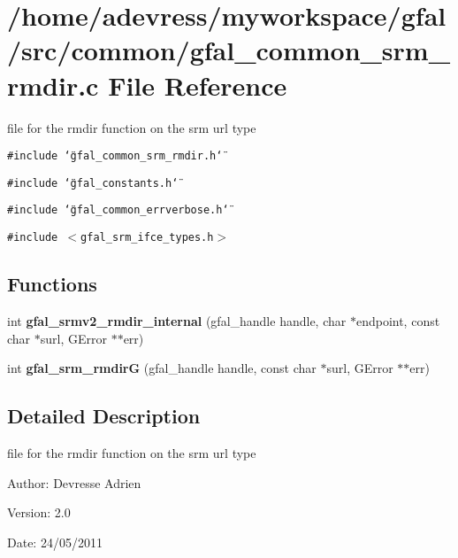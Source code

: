 \section{/home/adevress/myworkspace/gfal/src/common/gfal\_\-common\_\-srm\_\-rmdir.c File Reference}
\label{gfal__common__srm__rmdir_8c}
file for the rmdir function on the srm url type 

{\tt \#include \char`\"{}gfal\_\-common\_\-srm\_\-rmdir.h\char`\"{}}\par
{\tt \#include \char`\"{}gfal\_\-constants.h\char`\"{}}\par
{\tt \#include \char`\"{}gfal\_\-common\_\-errverbose.h\char`\"{}}\par
{\tt \#include $<$gfal\_\-srm\_\-ifce\_\-types.h$>$}\par
\subsection*{Functions}
\begin{CompactItemize}
\item 
int \textbf{gfal\_\-srmv2\_\-rmdir\_\-internal} (gfal\_\-handle handle, char $\ast$endpoint, const char $\ast$surl, GError $\ast$$\ast$err)\label{gfal__common__srm__rmdir_8c_22d081b3d5ca26d2e9cce6de8ee3be1c}

\item 
int \textbf{gfal\_\-srm\_\-rmdir\-G} (gfal\_\-handle handle, const char $\ast$surl, GError $\ast$$\ast$err)\label{gfal__common__srm__rmdir_8c_4c8ec8a7f1716aa19a83fc94dda6b08e}

\end{CompactItemize}


\subsection{Detailed Description}
file for the rmdir function on the srm url type 

\begin{Desc}
\item[Author:]Devresse Adrien \end{Desc}
\begin{Desc}
\item[Version:]2.0 \end{Desc}
\begin{Desc}
\item[Date:]24/05/2011 \end{Desc}
